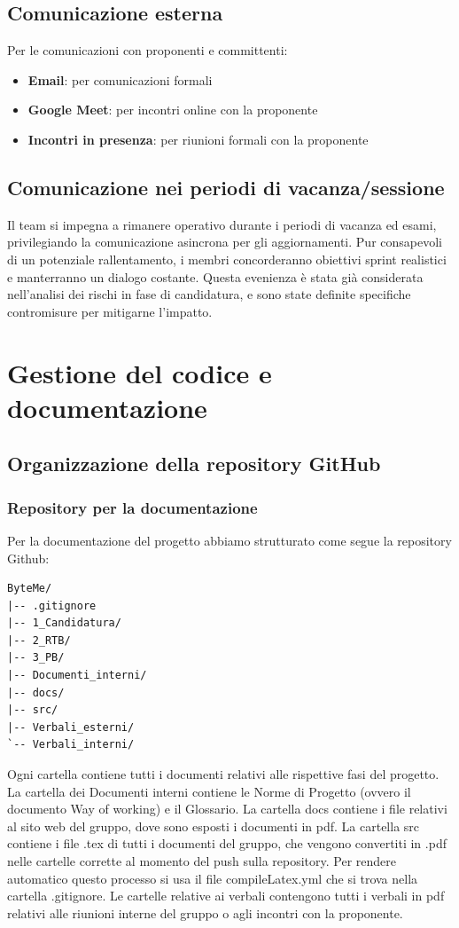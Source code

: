 \documentclass[11pt,a4paper]{article}
\begin{document}
\subsection{Comunicazione esterna}
Per le comunicazioni con proponenti e committenti:
\begin{itemize}
    \item \textbf{Email}: per comunicazioni formali
    \item \textbf{Google Meet}: per incontri online con la proponente
    \item \textbf{Incontri in presenza}: per riunioni formali con la proponente
\end{itemize}

\subsection{Comunicazione nei periodi di vacanza/sessione}
Il team si impegna a rimanere operativo durante i periodi di vacanza ed esami, privilegiando la comunicazione asincrona per gli aggiornamenti. Pur consapevoli di un potenziale rallentamento, i membri concorderanno obiettivi sprint realistici e manterranno un dialogo costante. Questa evenienza è stata già considerata nell'analisi dei rischi in fase di candidatura, e sono state definite specifiche contromisure per mitigarne l'impatto.

\newpage

\section{Gestione del codice e documentazione}

\subsection{Organizzazione della repository GitHub}

\subsubsection{Repository per la documentazione}
Per la documentazione del progetto abbiamo strutturato come segue la repository Github:
\begin{verbatim}
ByteMe/
|-- .gitignore
|-- 1_Candidatura/
|-- 2_RTB/
|-- 3_PB/
|-- Documenti_interni/
|-- docs/
|-- src/
|-- Verbali_esterni/
`-- Verbali_interni/
\end{verbatim}

Ogni cartella contiene tutti i documenti relativi alle rispettive fasi del progetto.
La cartella dei Documenti interni contiene le Norme di Progetto (ovvero il documento Way of working) e il Glossario.
La cartella docs contiene i file relativi al sito web del gruppo, dove sono esposti i documenti in pdf.
La cartella src contiene i file .tex di tutti i documenti del gruppo, che vengono convertiti in .pdf nelle cartelle corrette al momento del push sulla repository. Per rendere automatico questo processo si usa il file compileLatex.yml che si trova nella cartella .gitignore.
Le cartelle relative ai verbali contengono tutti i verbali in pdf relativi alle riunioni interne del gruppo o agli incontri con la proponente.
\end{document}

